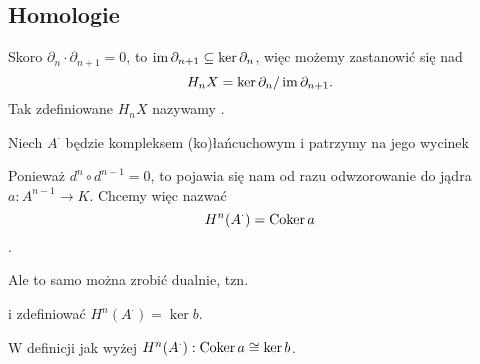 \subsection{Homologie}

Skoro $\partial_n\cdot\partial_{n+1}=0$, to $\operatorname{im}\partial_{n+1}\subseteq\ker\partial_n$, więc możemy zastanowić się nad
  $$H_nX=\ker\partial_n/\operatorname{im}\partial_{n+1}.$$
Tak zdefiniowane $H_nX$ nazywamy .

\begin{definition}
  Niech $A^\cdot$ będzie kompleksem (ko)łańcuchowym i patrzymy na jego wycinek
  \begin{center}\end{center}
  Ponieważ $d^n\circ d^{n-1}=0$, to pojawia się nam od razu odwzorowanie do jądra $a:A^{n-1}\to K$. Chcemy więc nazwać
  $$H^n(A^\cdot)=\operatorname{Coker} a$$
  .
\end{definition}

  Ale to samo można zrobić dualnie, tzn.

  \begin{center}\end{center}
  i zdefiniować $H^n(A^\cdot)=\ker b$.


\begin{lemma}
  W definicji jak wyżej $H^n(A^\cdot):\operatorname{Coker} a\cong\ker b$.
\end{lemma}

